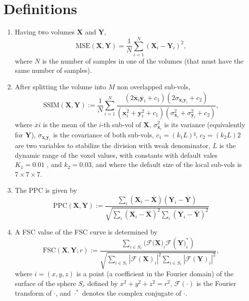 \documentclass{article}
\begin{document}
\section{Definitions}
\begin{enumerate}
  \item 
Having two volumes $\mathbf{X}$ and $\mathbf{Y}$,
\begin{equation}
  \text{MSE}(\mathbf{X},\mathbf{Y}) = \frac{1}{N}\sum_{i=1}^N(\mathbf{X}_i - \mathbf{Y}_i)^2,
\end{equation}
where $N$ is the number of samples in one of the volumes (that must
have the same number of samples).

\item
After splitting the volume into $M$ non overlapped sub-vols,
\begin{equation}
  \text{SSIM}(\mathbf{X}, \mathbf{Y}) := \frac{1}{N} \sum_{i=1}^N \frac{(2\overline{\mathbf{x}}_i \overline{\mathbf{y}}_i + c_1)(2\sigma_{\mathbf{x}_i \mathbf{y}_i} + c_2)}{(\overline{\mathbf{x}_i^2} + \overline{\mathbf{y}_i^2} + c_1)(\sigma^2_{\mathbf{x}_i} + \sigma^2_{\mathbf{y}_i} + c_2)},
\end{equation}
where $\overline{x}i$ is the mean of the $i$-th sub-vol of
$\mathbf{X}$, $\sigma^2_{\mathbf{x}_i}$ is its variance (equivalently
for $\mathbf{Y}$), $\sigma_{\mathbf{x}_i\mathbf{y}_i}$ is the
covariance of both sub-vols, $c_1=(k_1L) ²$, $c_2=(k_2L) 2$ are two
variables to stabilize the division with weak denominator, $L$ is the
dynamic range of the voxel values, with constants with default vales
$K_1=0.01$ , and $k_2=0.03$, and where the default size of the local
sub-vols is $7\times 7\times 7$.

\item
The PPC is given by
\begin{equation}
  \text{PPC}(\mathbf{X}, \mathbf{Y}) := \frac{\sum_i(\mathbf{X}_i - \overline{\mathbf{X}})(\mathbf{Y}_i - \overline{\mathbf{Y}})}{\sqrt{\sum_i (\mathbf{X}_i - \overline{\mathbf{X}})^2 \sum_i (\mathbf{Y}_i - \overline{\mathbf{Y}})^2}}
\end{equation}

\item
A FSC value of the FSC curve is determined by~\cite{verbeke2024self}
\begin{equation}
\text{FSC}(\mathbf{X}, \mathbf{Y}; r) := \frac{\sum_{i \in S_r} (\mathcal{F}(\mathbf{X)}_i \mathcal{F}(\mathbf{Y)}_i^*)}{\sqrt{\sum_{i \in S_r} |\mathcal{F}(\mathbf{X})_i|^2 \sum_{i \in S_r} |\mathcal{F}(\mathbf{Y})_i|^2}},
\end{equation}
where $i=(x, y, z)$ is a point (a coefficient in the Fourier domain)
of the surface of the sphere $S_r$ defined by $x^2+y^2+z^2=r^2$,
$\mathcal{F}(\cdot)$ is the Fourier transform of $\cdot$, and
$\cdot^*$ denotes the complex conjugate of $\cdot$.
\end{enumerate}
\end{document}
